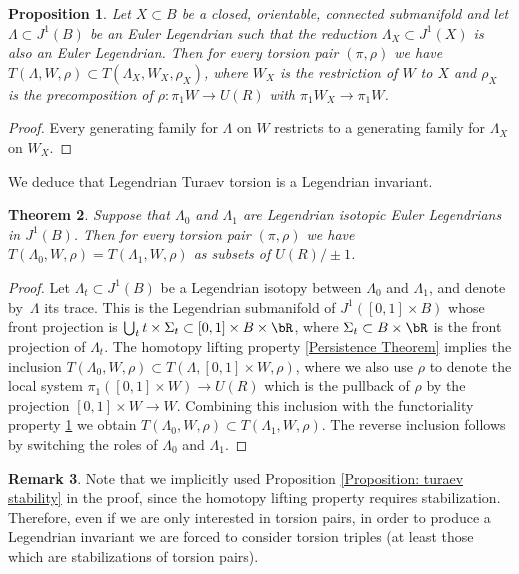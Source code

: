 \documentclass[JEP,XML,SOM,Unicode,NoFloatCountersInSection]{cedram}
\theoremstyle{plain}
\newtheorem{theorem}{Theorem}[section]
\newtheorem{proposition}[theorem]{Proposition}
\theoremstyle{definition}
\newtheorem{remark}[theorem]{Remark}
\begin{document}
\begin{proposition}\label{functoriality}
Let $X \subset B$ be a closed, orientable, connected submanifold and let $\Lambda \subset J^1(B)$ be an Euler Legendrian such that the reduction $\Lambda_X \subset J^1(X)$ is also an Euler Legendrian. Then for every torsion pair $(\pi, \rho)$ we have $T(\Lambda, W, \rho) \subset T(\Lambda_X, W_X, \rho_X)$, where $W_X$ is the restriction of $W$ to $X$ and $\rho_X$ is the precomposition of $\rho: \pi_1W \to U(R)$ with $\pi_1W_X \to \pi_1W$.
\end{proposition}

\begin{proof}
Every generating family for $\Lambda$ on $W$ restricts to a generating family for $\Lambda_X$ on $W_X$.
\end{proof}

We deduce that Legendrian Turaev torsion is a Legendrian invariant.

\begin{theorem}\label{legendrianinvariant}
Suppose that $\Lambda_0$ and $\Lambda_1$ are Legendrian isotopic Euler Legendrians in $J^1(B)$. Then for every torsion pair $(\pi, \rho)$ we have $T(\Lambda_0, W, \rho) = T(\Lambda_1, W, \rho)$ as subsets of $U(R) / \pm 1$.
\end{theorem}

\begin{proof}
Let $\Lambda_t\subset J^1(B)$ be a Legendrian isotopy between $\Lambda_0$ and $\Lambda_1$, and denote by~$\Lambda$ its trace. This is the Legendrian submanifold of $J^1([0,1] \times B)$ whose front projection is $\bigcup_t t \times \Sigma_t \subset [0,1] \times B \times \bR$, where $\Sigma_t \subset B \times \bR$ is the front projection of $\Lambda_t$. The homotopy lifting property \ref{Persistence Theorem} implies the inclusion \hbox{$T(\Lambda_0, W, \rho)\!\subset\!T(\Lambda, [0,1] \times W, \rho)$}, where we also use $\rho$ to denote the local system $\pi_1 ([0,1] \times W ) \to U(R)$ which is the pullback of $\rho$ by the projection $[0,1] \times W \to W$. Combining this inclusion with the functoriality property \ref{functoriality} we obtain $T(\Lambda_0, W, \rho) \subset T(\Lambda_1, W, \rho)$. The reverse inclusion follows by switching the roles of $\Lambda_0$ and $\Lambda_1$.
\end{proof}

\begin{remark}\label{remark: need triples}
Note that we implicitly used Proposition \ref{Proposition: turaev stability} in the proof, since the homotopy lifting property requires stabilization. Therefore, even if we are only interested in torsion pairs, in order to produce a Legendrian invariant we are forced to consider torsion triples (at least those which are stabilizations of torsion pairs).
\end{remark}
\end{document}
